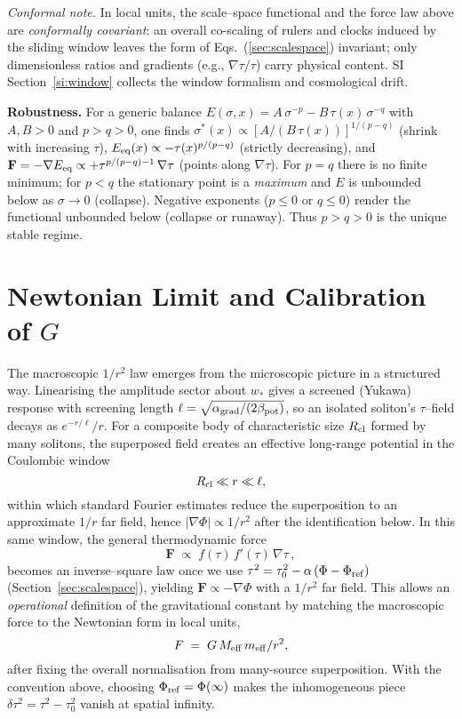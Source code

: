 \documentclass[11pt]{article}
\begin{document}
\noindent \textit{Conformal note.} In local units, the scale--space functional and the force law above are \emph{conformally covariant}: an overall co-scaling of rulers and clocks induced by the sliding window leaves the form of Eqs.~(\ref{sec:scalespace}) invariant; only dimensionless ratios and gradients (e.g., $\nabla\tau/\tau$) carry physical content. SI Section~\ref{si:window} collects the window formalism and cosmological drift.

\noindent \textbf{Robustness.} For a generic balance $E(\sigma,x)=A\,\sigma^{-p}-B\,\tau(x)\,\sigma^{-q}$ with $A,B>0$ and $p>q>0$, one finds $\sigma^*(x)\propto [A/(B\,\tau(x))]^{1/(p-q)}$ (shrink with increasing $\tau$), $E_{\rm eq}(x)\propto -\tau(x)^{p/(p-q)}$ (strictly decreasing), and $\mathbf F=-\nabla E_{\rm eq}\propto +\tau^{p/(p-q)-1}\,\nabla\tau$ (points along $\nabla\tau$). For $p=q$ there is no finite minimum; for $p<q$ the stationary point is a \emph{maximum} and $E$ is unbounded below as $\sigma\to 0$ (collapse). Negative exponents ($p\le0$ or $q\le0$) render the functional unbounded below (collapse or runaway). Thus $p>q>0$ is the unique stable regime.


\section{Newtonian Limit and Calibration of $G$}
The macroscopic $1/r^2$ law emerges from the microscopic picture in a structured way. Linearising the amplitude sector about $w_*$ gives a screened (Yukawa) response with screening length $\ell=\sqrt{\alpha_{\rm grad}/(2\beta_{\rm pot})}$, so an isolated soliton's $\tau$--field decays as $e^{-r/\ell}/r$. For a composite body of characteristic size $R_{\rm cl}$ formed by many solitons, the superposed field creates an effective long-range potential in the Coulombic window
\begin{equation}
  R_{\rm cl}\ll r\ll \ell,
\end{equation}
within which standard Fourier estimates reduce the superposition to an approximate $1/r$ far field, hence $|\nabla\Phi|\propto 1/r^2$ after the identification below. In this same window, the general thermodynamic force
\begin{equation}
  \mathbf F\;\propto\; f(\tau)\,f'(\tau)\,\nabla\tau\,,
\end{equation}
becomes an inverse--square law once we use $\tau^2=\tau_0^2-\alpha\,(\Phi-\Phi_{\rm ref})$ (Section~\ref{sec:scalespace}), yielding $\mathbf F\propto -\nabla\Phi$ with a $1/r^2$ far field. This allows an \emph{operational} definition of the gravitational constant by matching the macroscopic force to the Newtonian form in local units,
\begin{equation}
  F\;=\; G\, M_{\rm eff}\, m_{\rm eff}/r^2,
\end{equation}
after fixing the overall normalisation from many-source superposition. With the convention above, choosing $\Phi_{\rm ref}=\Phi(\infty)$ makes the inhomogeneous piece $\delta\tau^2=\tau^2-\tau_0^2$ vanish at spatial infinity.
\end{document}
